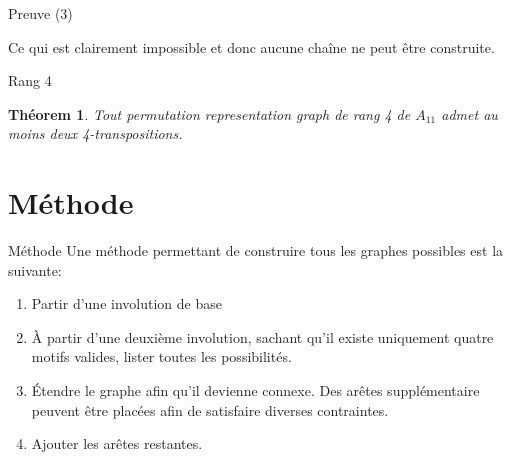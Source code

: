 \documentclass[10pt]{beamer}
\newtheorem{theorem}[definition]{Théorem}
\begin{document}
\begin{frame}{Preuve (3)}
\begin{figure}[H]
\begin{center}
    \end{center}
  \end{figure}

  Ce qui est clairement impossible et donc aucune chaîne ne peut être construite.

\end{frame}

\begin{frame}{Rang 4}
  \begin{theorem}
    Tout permutation representation graph de rang 4 de $A_{11}$ admet au moins deux 4-transpositions.
  \end{theorem}
\end{frame}

\section{Méthode}

\begin{frame}{Méthode}
  Une méthode permettant de construire tous les graphes possibles est la suivante:

  \begin{enumerate}
    \item Partir d'une involution de base
    \item À partir d'une deuxième involution, sachant qu'il existe uniquement quatre motifs valides, lister toutes les possibilités.
    \item Étendre le graphe afin qu'il devienne connexe. Des arêtes supplémentaire peuvent être placées afin de satisfaire diverses contraintes.
    \item Ajouter les arêtes restantes.
  \end{enumerate}
\end{frame}
\end{document}
